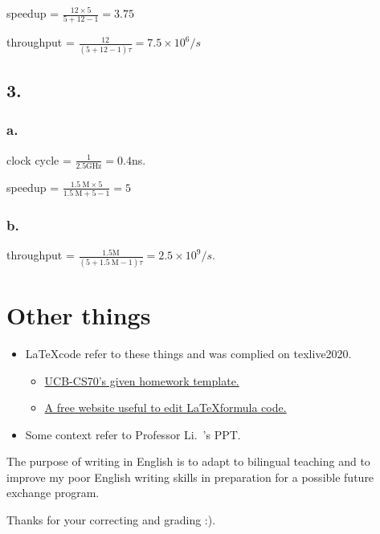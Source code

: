 \documentclass[11pt]{article}  %
\begin{document}
speedup = $\displaystyle \frac{12\times 5}{5+12-1} = 3.75$

throughput = $\displaystyle \frac{12}{(5+12-1)\tau} = 7.5\times 10^6 /s$

\subsection*{3. }

\subsubsection*{a. }

clock cycle = $\displaystyle \frac{1}{2.5 \text{GHz}} =  0.4$ns.

speedup = $\displaystyle \frac{1.5 ~\text{M}\times 5}{1.5 ~\text{M} + 5-1} = 5$

\subsubsection*{b. }

throughput = $\displaystyle \frac{1.5 \text{M}}{(5+1.5 ~\text{M}-1)\tau} = 2.5\times 10^9 /s $. 

\section*{Other things}

\begin{itemize}
    \item \LaTeX \space code refer to these things and was complied on texlive2020. 
    \begin{itemize}
        \item  \href{https://www.eecs70.org/assets/misc/homework_template.tex}{UCB-CS70's given homework template.} 
        \item  \href{https://www.latexlive.com}{A free website useful to edit \LaTeX \space formula code.}
    \end{itemize}
    \item Some context refer to Professor Li.~'s PPT.
\end{itemize}

The purpose of writing in English is to adapt to bilingual teaching and to improve my poor English 
writing skills in preparation for a possible future exchange program. 

    Thanks for your correcting and grading :).
\end{document}
